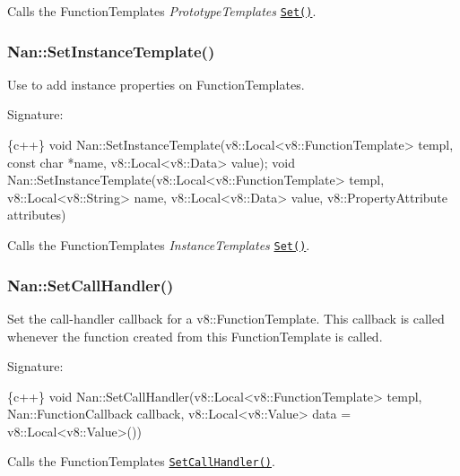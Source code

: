 Calls the {\ttfamily Function\+Template}\textquotesingle{}s {\itshape Prototype\+Template\textquotesingle{}s} \href{https://v8docs.nodesource.com/io.js-3.0/db/df7/classv8_1_1_template.html#a2db6a56597bf23c59659c0659e564ddf}{\tt {\ttfamily Set()}}.

\label{_api_nan_set_instance_template}%
 \subsubsection*{Nan\+::\+Set\+Instance\+Template()}

Use to add instance properties on {\ttfamily Function\+Template}\textquotesingle{}s.

Signature\+:


\begin{DoxyCode}
\{c++\}
void Nan::SetInstanceTemplate(v8::Local<v8::FunctionTemplate> templ,
                              const char *name,
                              v8::Local<v8::Data> value);
void Nan::SetInstanceTemplate(v8::Local<v8::FunctionTemplate> templ,
                              v8::Local<v8::String> name,
                              v8::Local<v8::Data> value,
                              v8::PropertyAttribute attributes)
\end{DoxyCode}


Calls the {\ttfamily Function\+Template}\textquotesingle{}s {\itshape Instance\+Template\textquotesingle{}s} \href{https://v8docs.nodesource.com/io.js-3.0/db/df7/classv8_1_1_template.html#a2db6a56597bf23c59659c0659e564ddf}{\tt {\ttfamily Set()}}.

\label{_api_nan_set_call_handler}%
 \subsubsection*{Nan\+::\+Set\+Call\+Handler()}

Set the call-\/handler callback for a {\ttfamily v8\+::\+Function\+Template}. This callback is called whenever the function created from this Function\+Template is called.

Signature\+:


\begin{DoxyCode}
\{c++\}
void Nan::SetCallHandler(v8::Local<v8::FunctionTemplate> templ, Nan::FunctionCallback callback,
       v8::Local<v8::Value> data = v8::Local<v8::Value>())
\end{DoxyCode}


Calls the {\ttfamily Function\+Template}\textquotesingle{}s \href{https://v8docs.nodesource.com/io.js-3.0/d8/d83/classv8_1_1_function_template.html#a26cf14e36aa1a47091b98536d08ea821}{\tt {\ttfamily Set\+Call\+Handler()}}.

